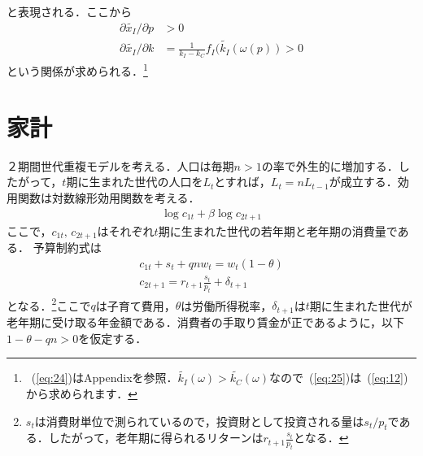 \documentclass[12pt,a4paper]{jsarticle}
\begin{document}
と表現される．ここから
\begin{align}
  \partial \tilde{x_{I}}/ \partial p &>0 \label{eq:24}\\
\partial \tilde{x_{I}}/ \partial k &= \frac{1}{k_{I}-k_{C}} f_{I}(\tilde{k_{I}}(\omega(p))>0 \label{eq:25}
\end{align}
という関係が求められる．\footnote{~(\ref{eq:24})はAppendixを参照．$\tilde{k_{I}}(\omega) > \tilde{k_{C}}(\omega)$なので~(\ref{eq:25})は~(\ref{eq:12})から求められます．}








\section{家計}
２期間世代重複モデルを考える．人口は毎期$n>1$の率で外生的に増加する．したがって，$t$期に生まれた世代の人口を$L_{t}$とすれば，$L_{t} = nL_{t-1}$が成立する．効用関数は対数線形効用関数を考える．
\begin{align}
 \log c_{1t} + \beta \log c_{2 t+1}
\end{align}
ここで，$c_{1 t}, \, c_{2 t+1}$はそれぞれ$t$期に生まれた世代の若年期と老年期の消費量である．
予算制約式は
\begin{align}
 c_{1 t} + s_{t} +qnw_{t} = w_{t}(1-\theta) \\
c_{2 t+1} = r_{t+1}\frac{s_{t}}{p_{t}} + \delta_{t+1} 
\end{align}
となる．\footnote{$s_{t}$は消費財単位で測られているので，投資財として投資される量は$s_{t}/p_{t}$である．したがって，老年期に得られるリターンは$r_{t+1}\frac{s_{t}}{p_{t}}$となる．}ここで$q$は子育て費用，$\theta$は労働所得税率，$\delta_{t+1}$は$t$期に生まれた世代が老年期に受け取る年金額である．消費者の手取り賃金が正であるように，以下$1-\theta-qn>0$を仮定する．
\end{document}
